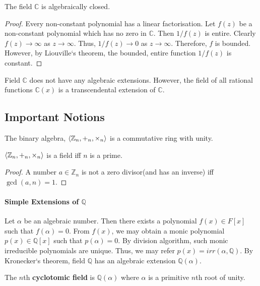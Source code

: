 \begin{theorem}
	The field $\mathbb{C}$ is algebraically closed.
\end{theorem}
\begin{proof}
	Every non-constant polynomial has a linear factorisation.
	Let $f(z)$ be a non-constant polynomial which has no zero in $\mathbb{C}$.
	Then $1/f(z)$ is entire.
	Clearly $f(z) \to \infty$ as $z \to \infty$.
	Thus, $1/f(z) \to 0$ as $z \to \infty$.
	Therefore, $f$ is bounded.
	However, by Liouville`s theorem, the bounded, entire function $1/f(z)$ is constant.
\end{proof}

	Field $\mathbb{C}$ does not have any algebraic extensions. However, the field of all rational functions $\mathbb{C}(x)$ is a transcendental extension of $\mathbb{C}$.

\subsection*{Important Notions}
	\par The binary algebra, $\left\langle \mathbb{Z}_n,+_n,\times_n \right\rangle$ is a commutative ring with unity. 

	\begin{theorem}
	$\left\langle \mathbb{Z}_n,+_n,\times_n \right\rangle$ is a field iff $n$ is a prime. 
	\end{theorem}
	\begin{proof}
		A number $a \in \mathbb{Z}_n$ is not a zero divisor(and has an inverse) iff $\gcd(a,n) = 1$.
	\end{proof}

\paragraph{Simple Extensions of $\mathbb{Q}$}
	Let $\alpha$ be an algebraic number. Then there exists a polynomial $f(x) \in F[x]$ such that $f(\alpha) = 0$.
	From $f(x)$, we may obtain a monic polynomial $p(x) \in \mathbb{Q}[x]$ such that $p(\alpha) = 0$.
	By division algorithm, such monic irreducible polynomials are unique.
	Thus, we may refer $p(x) = irr(\alpha,\mathbb{Q})$.
	By Kronecker`s theorem, field $\mathbb{Q}$ has an algebraic extension $\mathbb{Q}(\alpha)$.
	
\begin{definition}
	The $n$th \textbf{cyclotomic field} is $\mathbb{Q}(\alpha)$ where $\alpha$ is a primitive $n$th root of unity.
\end{definition}

